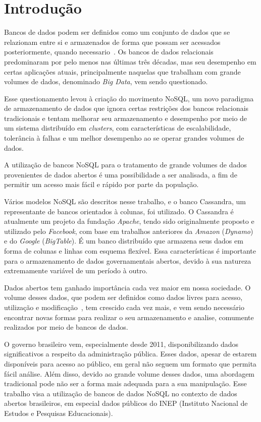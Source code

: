 \chapter{Introdução}

Bancos de dados podem ser definidos como um conjunto de dados que se relazionam entre si e armazenados de forma que possam ser acessados posteriormente, quando necessario~\cite{leavitt2010nosql}.
Os bancos de dados relacionais predominaram por pelo menos nas últimas três décadas, mas seu desempenho em certas aplicações atuais, principalmente naquelas que trabalham com grande volumes de dados, denominado \emph{Big Data}, vem sendo questionado. 

Esse questionamento levou à criação do movimento NoSQL, um novo paradigma de armazenamento de dados que ignora certas restrições dos bancos relacionais tradicionais e tentam melhorar seu armazenamento e desempenho por meio de um sistema distribuído em \emph{clusters}, com características de escalabilidade, tolerância à falhas e um melhor desempenho ao se operar grandes volumes de dados.

A utilização de bancos NoSQL para o tratamento de grande volumes de dados provenientes de dados abertos é uma possibilidade a ser analisada, a fim de permitir um acesso mais fácil e rápido por parte da população. 

Vários modelos NoSQL são descritos nesse trabalho, e o banco Cassandra, um representante de bancos orientados à colunas, foi utilizado. O Cassandra é atualmente um projeto da fundação \emph{Apache}, tendo sido  originalmente proposto e utilizado pelo \emph{Facebook}, com base em trabalhos anteriores da \emph{Amazon} (\emph{Dynamo}) e do \emph{Google} (\emph{BigTable}). É um banco distribuído que armazena seus dados em forma de colunas e linhas com esquema flexível. Essa características é importante para o armazenamento de dados governamentais abertos, devido à sua natureza extremamente variável de um período à outro.

Dados abertos tem ganhado importância cada vez maior em nossa sociedade. O volume desses dados, que podem ser definidos como dados livres para acesso, utilização e modificação~\cite{opendefinition}, tem crescido cada vez mais, e vem sendo necessário encontrar novas formas para realizar o seu armazenamento e analise, comumente realizados por meio de bancos de dados.

O governo brasileiro vem, especialmente desde 2011, disponibilizando dados significativos a respeito da administração pública. Esses dados, apesar de estarem disponíveis para acesso ao público, em geral não seguem um formato que permita fácil análise. Além disso, devido ao grande volume desses dados, uma abordagem tradicional pode não ser a forma mais adequada para a sua manipulação. Esse trabalho visa a utilização de bancos de dados NoSQL no contexto de dados abertos brasileiros, em especial dados públicos do INEP (Instituto Nacional de Estudos e Pesquisas Educacionais).

